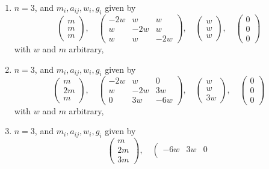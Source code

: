 \begin{lemma}
\begin{enumerate}
$$\right)
$$
with $w$ and $m$ arbitrary,
\item
\label{models-item-three-cycle}
$n = 3$, and $m_i, a_{ij}, w_i, g_i$ given by
$$
\left(
\begin{matrix}
m \\
m \\
m
\end{matrix}
\right),
\quad
\left(
\begin{matrix}
-2w & w & w \\
w & -2w & w \\
w & w & -2w
\end{matrix}
\right),
\quad
\left(
\begin{matrix}
w \\
w \\
w
\end{matrix}
\right),
\quad
\left(
\begin{matrix}
0 \\
0 \\
0
\end{matrix}
\right)
$$
with $w$ and $m$ arbitrary,
\item
\label{models-item-equal-up3}
$n = 3$, and $m_i, a_{ij}, w_i, g_i$ given by
$$
\left(
\begin{matrix}
m \\
2m \\
m
\end{matrix}
\right),
\quad
\left(
\begin{matrix}
-2w & w & 0 \\
w & -2w & 3w \\
0 & 3w & -6w
\end{matrix}
\right),
\quad
\left(
\begin{matrix}
w \\
w \\
3w
\end{matrix}
\right),
\quad
\left(
\begin{matrix}
0 \\
0 \\
0
\end{matrix}
\right)
$$
with $w$ and $m$ arbitrary,
\item
\label{models-item-equal-down3}
$n = 3$, and $m_i, a_{ij}, w_i, g_i$ given by
$$
\left(
\begin{matrix}
m \\
2m \\
3m
\end{matrix}
\right),
\quad
\left(
\begin{matrix}
-6w & 3w & 0 \\

\end{matrix}$$
\end{enumerate}
\end{lemma}

